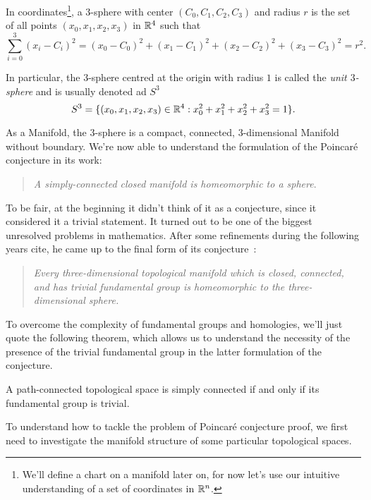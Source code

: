 \begin{definition}[$3$-sphere]
    In coordinates\footnote{We'll define a chart on a manifold later on, for now let's use our intuitive understanding of a set of coordinates in $\mathbb{R}^n$.}, a $3$-sphere with center $(C_0,C_1,C_2,C_3)$ and radius $r$ is the set of all points $(x_0,x_1,x_2,x_3)$ in $\mathbb{R}^4$ such that
    \begin{equation}
        \sum_{i=0}^3 (x_i - C_i)^2 = (x_0 - C_0)^2 + (x_1 - C_1)^2 + (x_2 - C_2)^2 + (x_3 - C_3)^2 = r^2.
    \end{equation}

    In particular, the $3$-sphere centred at the origin with radius $1$ is called the \emph{unit $3$-sphere} and is usually denoted ad $S^3$
    \begin{equation}
        S^3 = \{ (x_0,x_1,x_2,x_3) \in \mathbb{R}^4 : x_0^2 + x_1^2 + x_2^2 + x_3^2 = 1 \} .
    \end{equation}
\end{definition}

As a Manifold, the $3$-sphere  is a compact, connected, $3$-dimensional Manifold without boundary. We're now able to understand the formulation of the Poincaré conjecture in its work:

\begin{quotation}
    \noindent \emph{A simply-connected closed manifold is homeomorphic to a sphere}.
\end{quotation}

To be fair, at the beginning it didn't think of it as a conjecture, since it considered it a trivial statement. It turned out to be one of the biggest unresolved problems in mathematics. After some refinements during the following years \color{red}cite\color{black}, he came up to the final form of its conjecture~\cite{poincare:complement}:

\begin{quotation}
    \noindent \emph{Every three-dimensional topological manifold which is closed, connected, and has trivial fundamental group is homeomorphic to the three-dimensional sphere.}
\end{quotation}

To overcome the complexity of fundamental groups and homologies, we'll just quote the following theorem, which allows us to understand the necessity of the presence of the trivial fundamental group in the latter formulation of the conjecture.

\begin{theorem}
    A path-connected topological space is simply connected if and only if its fundamental group is trivial.
\end{theorem}

To understand how to tackle the problem of Poincaré conjecture proof, we first need to investigate the manifold structure of some particular topological spaces.